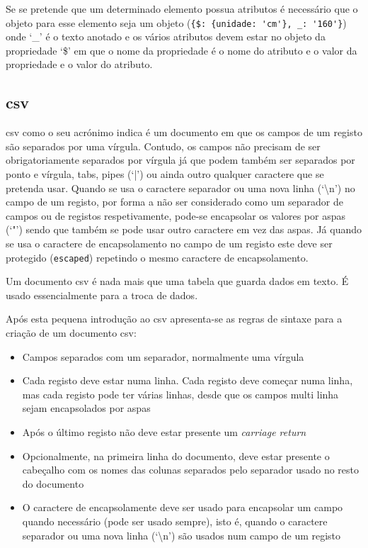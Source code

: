 Se se pretende que um determinado elemento possua atributos é necessário que o objeto para esse elemento seja um objeto (\verb|{$: {unidade: 'cm'}, _: '160'}|) onde `\_' é o texto anotado e os vários atributos devem estar no objeto da propriedade `\$' em que o nome da propriedade é o nome do atributo e o valor da propriedade e o valor do atributo.

\subsection{\acrshort{csv}}

\acrfull{csv} como o seu acrónimo indica é um documento em que os campos de um registo são separados por uma vírgula. Contudo, os campos não precisam de ser obrigatoriamente separados por vírgula já que podem também ser separados por ponto e vírgula, tabs, pipes (`|') ou ainda outro qualquer caractere que se pretenda usar. Quando se usa o caractere separador ou uma nova linha (`\backslash{}n') no campo de um registo, por forma a não ser considerado como um separador de campos ou de registos respetivamente, pode-se encapsolar os valores por aspas (`"') sendo que também se pode usar outro caractere em vez das aspas. Já quando se usa o caractere de encapsolamento no campo de um registo este deve ser protegido (\texttt{escaped}) repetindo o mesmo caractere de encapsolamento.

Um documento \acrshort{csv} é nada mais que uma tabela que guarda dados em texto. É usado essencialmente para a troca de dados.

Após esta pequena introdução ao \acrshort{csv} apresenta-se as regras de sintaxe para a criação de um documento \acrshort{csv}:
\begin{itemize}
    \item Campos separados com um separador, normalmente uma vírgula
    \item Cada registo deve estar numa linha. Cada registo deve começar numa linha, mas cada registo pode ter várias linhas, desde que os campos multi linha sejam encapsolados por aspas
    \item Após o último registo não deve estar presente um \textit{carriage return}
    \item Opcionalmente, na primeira linha do documento, deve estar presente o cabeçalho com os nomes das colunas separados pelo separador usado no resto do documento
    \item O caractere de encapsolamente deve ser usado para encapsolar um campo quando necessário (pode ser usado sempre), isto é, quando o caractere separador ou uma nova linha (`\backslash{}n') são usados num campo de um registo
\end{itemize}


